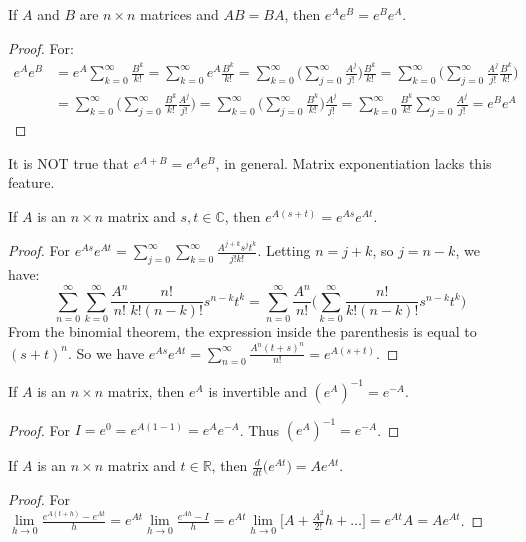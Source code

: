 \documentclass[crop=false,class=book]{standalone}
\begin{document}
\begin{theorem}
If $A$ and $B$ are $n\times n$ matrices and $AB = BA$, then $e^{A}e^{B} = e^{B}e^{A}$.
\end{theorem}
\begin{proof}
For:
\begin{align*}
    e^A e^B &= e^A\sum_{k=0}^{\infty}\frac{B^k}{k!}=\sum_{k=0}^{\infty} e^A\frac{B^k}{k!}= \sum_{k=0}^{\infty} \big(\sum_{j=0}^{\infty} \frac{A^j}{j!}\big) \frac{B^k}{k!}= \sum_{k=0}^{\infty}\big(\sum_{j=0}^{\infty} \frac{A^j}{j!}\frac{B^k}{k!}\big)\\
    &=\sum_{k=0}^{\infty}\big(\sum_{j=0}^{\infty} \frac{B^k}{k!}\frac{A^j}{j!}\big)=\sum_{k=0}^{\infty}\big(\sum_{j=0}^{\infty} \frac{B^k}{k!}\big)\frac{A^j}{j!}= \sum_{k=0}^{\infty}\frac{B^k}{k!}\sum_{j=0}^{\infty}\frac{A^j}{j!}=e^{B}e^{A}
\end{align*}
\end{proof}
It is NOT true that $e^{A+B}=e^{A}e^{B}$, in general. Matrix exponentiation lacks this feature.
\begin{theorem}
If $A$ is an $n\times n$ matrix and $s,t\in \mathbb{C}$, then $e^{A(s+t)} = e^{As}e^{At}$.
\end{theorem}
\begin{proof}
For $e^{As}e^{At} = \sum_{j=0}^{\infty} \sum_{k=0}^{\infty} \frac{A^{j+k}s^jt^k}{j!k!}$. Letting $n = j+k$, so $j = n-k$, we have:
\begin{equation*}
    \sum_{n=0}^{\infty} \sum_{k=0}^{\infty} \frac{A^n}{n!}\frac{n!}{k!(n-k)!}s^{n-k}t^k = \sum_{n=0}^{\infty}\frac{A^n}{n!}\big(\sum_{k=0}^{\infty} \frac{n!}{k!(n-k)!}s^{n-k}t^k\big)    
\end{equation*}
From the binomial theorem, the expression inside the parenthesis is equal to $(s+t)^n$. So we have $e^{As}e^{At}=\sum_{n=0}^{\infty} \frac{A^n(t+s)^n}{n!} = e^{A(s+t)}$.
\end{proof}
\begin{theorem}
If $A$ is an $n\times n$ matrix, then $e^A$ is invertible and $(e^A)^{-1} = e^{-A}$.
\end{theorem}
\begin{proof}
For $I = e^{0} = e^{A(1-1)} = e^Ae^{-A}$. Thus $(e^{A})^{-1} = e^{-A}$.
\end{proof}
\begin{theorem}
If $A$ is an $n\times n$ matrix and $t\in \mathbb{R}$, then $\frac{d}{dt}\big(e^{At}\big) = Ae^{At}$.
\end{theorem}
\begin{proof}
For $\underset{h\rightarrow 0}\lim \frac{e^{A(t+h)}-e^{At}}{h} = e^{At}\underset{h\rightarrow 0}\lim \frac{e^{Ah}-I}{h} = e^{At}\underset{h\rightarrow 0}\lim\big[A+\frac{A^2}{2!}h+\hdots\big] = e^{At}A = Ae^{At}$.
\end{proof}
\end{document}
